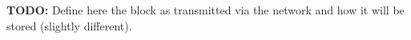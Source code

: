 \textbf{TODO:} Define here the block as transmitted via the network and how it
will be stored (slightly different).

